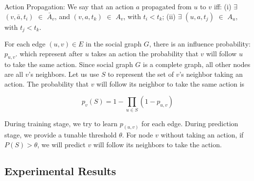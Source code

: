 \begin{definition}{Action Propagation:}
We say that an action $a$ propagated from $u$ to $v$ iff: (i) $\exists$ $(v, \bar{a}, t_i)$ $\in$ $\bar{A}_v$, 
and $(v, a, t_k)$ $\in$ $A_v$, with $t_i < t_k$; (ii) $\exists$ $(u, a, t_j)$ $\in$ $A_u$, with $t_j < t_k$. 
\end{definition}

For each edge $(u, v) \in E$ in the social graph $G$, 
there is an influence probability: $p_{u,v}$. 
which represent after $u$ takes an action the probability that $v$ will follow $u$ to take the same action. 
Since social graph $G$ is a complete graph, 
all other nodes are all $v$’s neighbors. Let us use $S$ to represent the set of $v$’s neighbor taking an action. 
The probability that $v$ will follow its neighbor to take the same action is

$$p_v(S) = 1 - \prod\limits_{u \in S}(1 - p_{u,v})$$

During training stage, we try to learn $p_(u,v)$ for each edge. 
During prediction stage, we provide a tunable threshold $\theta$. For node $v$ without taking an action, 
if $P(S) > \theta$, we will predict $v$ will follow its neighbors to take the action. 



\subsection{Experimental Results}